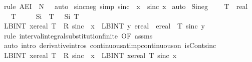 \documentclass[leqno]{article}
\theoremstyle{definition}
\begin{document}
\begin{isabellebody}
\ {\isacharparenleft}rule\ AE{\isacharunderscore}I{\isacharprime}\ {\isacharbrackleft}\ N\ {\isacharequal}\ {\isachardoublequoteopen}{\isacharbraceleft}{}{\isacharbraceright}{\isachardoublequoteclose}{\isacharbrackright}{\isacharcomma}\ auto{\isacharparenright}%
\isanewline
{}\isamarkupfalse%
\ sinc{\isacharunderscore}neg\ {\isacharbrackleft}simp{\isacharbrackright}{\isacharcolon}\ {\isachardoublequoteopen}sinc\ {\isacharparenleft}{\isacharminus}\ x{\isacharparenright}\ {\isacharequal}\ sinc\ x{\isachardoublequoteclose}%
\isamarkupfalse%
\ auto%
\isanewline
\isanewline
{}\isamarkupfalse%
\ Si{\isacharunderscore}neg{\isacharcolon}\ \isanewline
\ \ \ T\ {\isacharcolon}{\isacharcolon}\ real\isanewline
\ \ \ {\isachardoublequoteopen}T\ {\isasymge}\ {}{\isachardoublequoteclose}\isanewline
\ \ \ {\isachardoublequoteopen}Si\ {\isacharparenleft}{\isacharminus}\ T{\isacharparenright}\ {\isacharequal}\ {\isacharminus}\ Si\ T{\isachardoublequoteclose}\isanewline
{}\isamarkupfalse%
\ {\isacharminus}\isanewline
\ \ \isamarkupfalse%
\ {\isachardoublequoteopen}LBINT\ x{\isacharequal}ereal\ {}{\isachardot}{\isachardot}T{\isachardot}\ {\isacharminus}{}\ {\isacharasterisk}\isactrlsub R\ sinc\ {\isacharparenleft}{\isacharminus}\ x{\isacharparenright}\ {\isacharequal}\ LBINT\ y{\isacharequal}\ ereal\ {\isacharparenleft}{\isacharminus}\ {}{\isacharparenright}{\isachardot}{\isachardot}ereal\ {\isacharparenleft}{\isacharminus}\ T{\isacharparenright}{\isachardot}\ sinc\ y{\isachardoublequoteclose}\isanewline
\ \ \ \ \isamarkupfalse%
\ {\isacharparenleft}rule\ interval{\isacharunderscore}integral{\isacharunderscore}substitution{\isacharunderscore}finite\ {\isacharbrackleft}OF\ assms{\isacharbrackright}{\isacharparenright}\isanewline
\ \ \ \ \isamarkupfalse%
\ {\isacharparenleft}auto\ intro{\isacharcolon}\ derivative{\isacharunderscore}intros\ continuous{\isacharunderscore}at{\isacharunderscore}imp{\isacharunderscore}continuous{\isacharunderscore}on\ isCont{\isacharunderscore}sinc{\isacharparenright}\isanewline
\ \ \isamarkupfalse%
\ \isamarkupfalse%
\ {\isachardoublequoteopen}{\isacharparenleft}LBINT\ x{\isacharequal}ereal\ {}{\isachardot}{\isachardot}T{\isachardot}\ {\isacharminus}{}\ {\isacharasterisk}\isactrlsub R\ sinc\ {\isacharparenleft}{\isacharminus}\ x{\isacharparenright}{\isacharparenright}\ {\isacharequal}\ {\isacharminus}{\isacharparenleft}LBINT\ x{\isacharequal}ereal\ {}{\isachardot}{\isachardot}T{\isachardot}\ sinc\ x{\isacharparenright}{\isachardoublequoteclose}\isanewline

\end{isabellebody}
\end{document}
